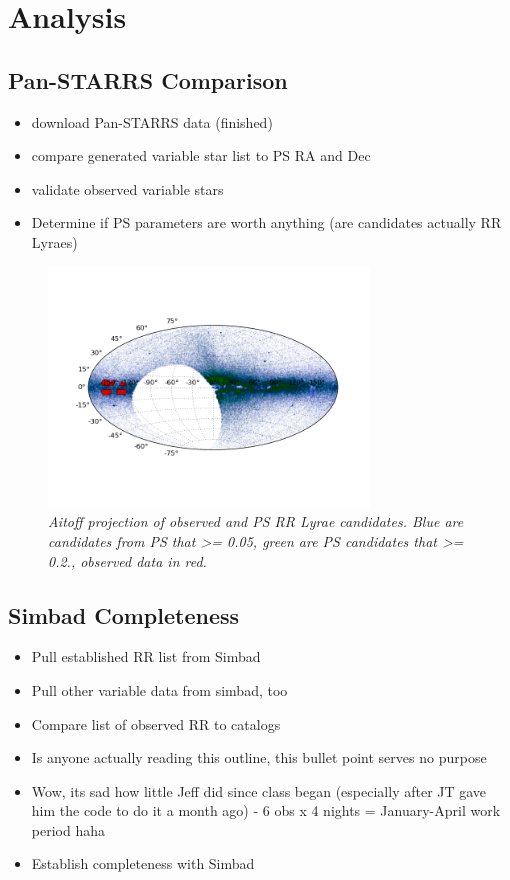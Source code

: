 \documentclass[aps,prl,twocolumn,superscriptaddress]{revtex4-1}
\begin{document}
\section{Analysis}

\subsection{Pan-STARRS Comparison}
\begin{itemize}
	\item{} download Pan-STARRS data (finished)
	\item{} compare generated variable star list to PS RA and Dec
	\item{} validate observed variable stars
	\item{} Determine if PS parameters are worth anything (are candidates actually RR Lyraes)
\end{itemize}

\begin{figure}[H]
 \centering
 \includegraphics[width=3.35in]{figures/aitoff/Obs_PS_lsum_aitoff_map.png}
 \caption{\it \small{Aitoff projection of observed and PS RR Lyrae candidates.  Blue are candidates from PS that >= 0.05, green are PS candidates that >= 0.2., observed data in red.}}%
 \label{fig:aitoff_nosimbad}
\end{figure}

\subsection{Simbad Completeness}
\begin{itemize}
	\item{} Pull established RR list from Simbad
	\item{} Pull other variable data from simbad, too
	\item{} Compare list of observed RR to catalogs
	\item{} Is anyone actually reading this outline, this bullet point serves no purpose
	\item{} Wow, its sad how little Jeff did since class began (especially after JT gave him the code to do it a month ago) - 6 obs x 4 nights = January-April work period haha
	\item{} Establish completeness with Simbad
\end{itemize}
\end{document}
